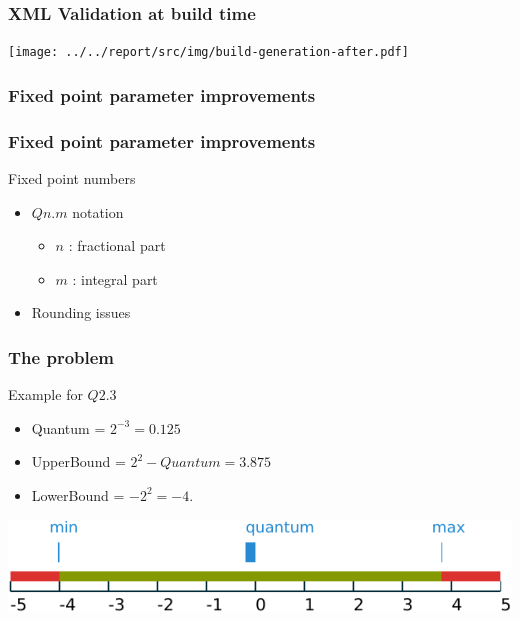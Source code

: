 \begin{frame}
    \frametitle{XML Validation at build time}
    \texttt{[image: ../../report/src/img/build-generation-after.pdf]}
\end{frame}

\subsubsection{Fixed point parameter improvements}
\begin{frame}
    \frametitle{Fixed point parameter improvements}
    \begin{block}{Fixed point numbers}
        \begin{itemize}
            \item $Qn.m$ notation
                \begin{itemize}
                    \item $n$ : fractional part
                    \item $m$ : integral part
                \end{itemize}
            \item Rounding issues
        \end{itemize}
    \end{block}
\end{frame}

\begin{frame}
    \frametitle{The problem}
    \begin{minipage}{0.49\textwidth}
        \begin{block}{Example for $Q2.3$}
            \begin{itemize}
                \item Quantum = $2^{-3} = 0.125$
                \item UpperBound = $2^2 - Quantum = 3.875$
                \item LowerBound = $-2^2 = -4$.
            \end{itemize}
        \end{block}
    \end{minipage}
    \begin{minipage}{0.49\textwidth}
        \flushright
        \includegraphics[width=\textwidth]{../../report/src/img/fixedPoint.pdf}
    \end{minipage}
\end{frame}

